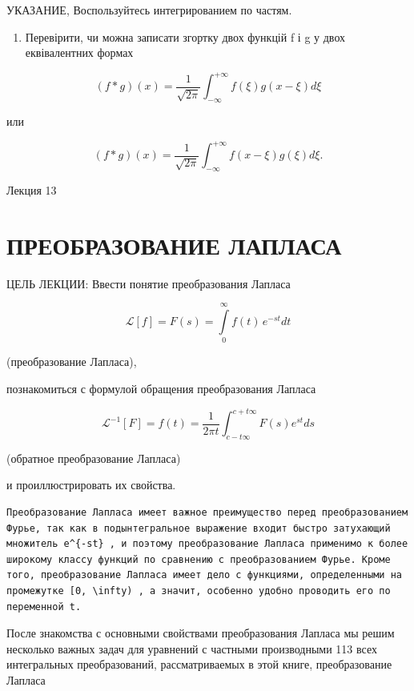 \documentclass[
  ukrainian,
]{article}
\providecommand{\tightlist}{%
  \setlength{\itemsep}{0pt}\setlength{\parskip}{0pt}}
\begin{document}
УКАЗАНИЕ, Воспользуйтесь интегрированием по частям.

\begin{enumerate}
\def\labelenumi{\arabic{enumi}.}
\setcounter{enumi}{4}
\tightlist
\item
  Перевірити, чи можна записати згортку двох функцій f і g у двох
  еквівалентних формах
\end{enumerate}

\[
(f * g)(x) = \frac{1}{\sqrt{2\pi}} \int_{-\infty}^{+\infty} f(\xi) g(x - \xi) d\xi
\]

или

\[
(f * g)(x) = \frac{1}{\sqrt{2\pi}} \int_{-\infty}^{+\infty} f(x-\xi) g(\xi) d\xi.
\]

Лекция 13

\section{ПРЕОБРАЗОВАНИЕ
ЛАПЛАСА}\label{ux43fux440ux435ux43eux431ux440ux430ux437ux43eux432ux430ux43dux438ux435-ux43bux430ux43fux43bux430ux441ux430}

ЦЕЛЬ ЛЕКЦИИ: Ввести понятие преобразования Лапласа

\[
\mathscr{L}[f] = F(s) = \int\limits_0^\infty f(t)\,e^{-st}dt
\]

(преобразование Лапласа),

познакомиться с формулой обращения преобразования Лапласа

\[
\mathscr{L}^{-1}[F] = f(t) = \frac{1}{2\pi t} \int_{c-t\infty}^{c+t\infty} F(s) e^{st} ds
\]

(обратное преобразование Лапласа)

и проиллюстрировать их свойства.

\begin{verbatim}
Преобразование Лапласа имеет важное преимущество перед преобразованием Фурье, так как в подынтегральное выражение входит быстро затухающий множитель e^{-st} , и поэтому преобразование Лапласа применимо к более широкому классу функций по сравнению с преобразованием Фурье. Кроме того, преобразование Лапласа имеет дело с функциями, определенными на промежутке [0, \infty) , а значит, особенно удобно проводить его по переменной t.
\end{verbatim}

После знакомства с основными свойствами преобразования Лапласа мы решим
несколько важных задач для уравнений с частными производными 113 всех
интегральных преобразований, рассматриваемых в этой книге,
преобразование Лапласа
\end{document}
